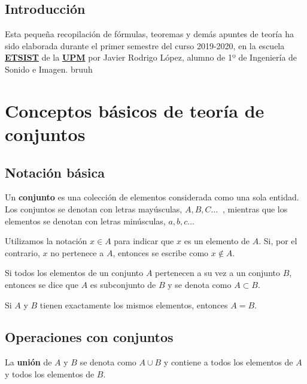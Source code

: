 \documentclass[a4paper]{book}
\begin{document}
\newpage
\setlength{\parskip}{0.5em}

\section*{Introducción}
Esta pequeña recopilación de fórmulas, teoremas y demás apuntes de teoría ha sido elaborada durante el primer semestre del curso 2019-2020, en la escuela \href{https://www.etsist.upm.es/}{\textbf{ETSIST}} de la \href{http://www.upm.es/}{\textbf{UPM}} por Javier Rodrigo López, alumno de 1º de Ingeniería de Sonido e Imagen.
bruuh
\newpage

\setlength{\parskip}{0em}
\tableofcontents
\setlength{\parskip}{0.5em}

\chapter*{Conceptos básicos de teoría de conjuntos}
\section*{Notación básica}
\begin{definicion}
	Un \textbf{conjunto} es una colección de elementos considerada como una sola entidad. Los conjuntos se denotan con letras mayúsculas, $A,B,C \ldots \ $ , mientras que los elementos se denotan con letras minúsculas, $a,b,c \ldots $

	Utilizamos la notación $x\in A$ para indicar que $x$ es un elemento de $A$. Si, por el contrario, $x$ no pertenece a $A$, entonces se escribe como $x\not \in A$.

	Si todos los elementos de un conjunto $A$ pertenecen a su vez a un conjunto $B$, entonces se dice que $A$ es subconjunto de $B$ y se denota como $A\subset B$.

	Si $A$ y $B$ tienen exactamente los mismos elementos, entonces $A=B$.
\end{definicion}

\section*{Operaciones con conjuntos}
\begin{definicion}
	La \textbf{unión} de $A$ y $B$ se denota como $A\cup B$ y contiene a todos los elementos de $A$ y todos los elementos de $B$.
\end{definicion}
\end{document}
